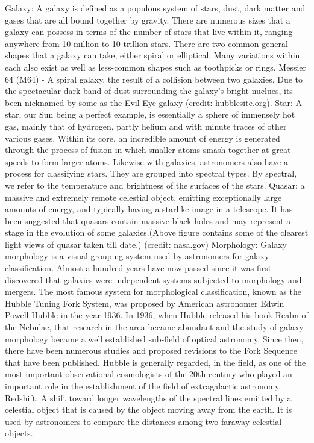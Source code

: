 \documentclass[11pt]{article}
\begin{document}
Galaxy: A galaxy is defined as a populous system of stars, dust, dark
matter and gases that are all bound together by gravity. There are
numerous sizes that a galaxy can possess in terms of the number of stars
that live within it, ranging anywhere from 10 million to 10 trillion
stars. There are two common general shapes that a galaxy can take,
either spiral or elliptical. Many variations within each also exist as
well as less-common shapes such as toothpicks or rings. Messier 64 (M64)
- A spiral galaxy, the result of a collision between two galaxies. Due
to the spectacular dark band of dust surrounding the galaxy's bright
nuclues, its been nicknamed by some as the Evil Eye galaxy (credit:
hubblesite.org). Star: A star, our Sun being a perfect example, is
essentially a sphere of immensely hot gas, mainly that of hydrogen,
partly helium and with minute traces of other various gases. Within its
core, an incredible amount of energy is generated through the process of
fusion in which smaller atoms smash together at great speeds to form
larger atoms. Likewise with galaxies, astronomers also have a process
for classifying stars. They are grouped into spectral types. By
spectral, we refer to the temperature and brightness of the surfaces of
the stars. Quasar: a massive and extremely remote celestial object,
emitting exceptionally large amounts of energy, and typically having a
starlike image in a telescope. It has been suggested that quasars
contain massive black holes and may represent a stage in the evolution
of some galaxies.(Above figure contains some of the clearest light views
of quasar taken till date.) (credit: nasa.gov) Morphology: Galaxy
morphology is a visual grouping system used by astronomers for galaxy
classification. Almost a hundred years have now passed since it was
first discovered that galaxies were independent systems subjected to
morphology and mergers. The most famous system for morphological
classification, known as the Hubble Tuning Fork System, was proposed by
American astronomer Edwin Powell Hubble in the year 1936. In 1936, when
Hubble released his book Realm of the Nebulae, that research in the area
became abundant and the study of galaxy morphology became a well
established sub-field of optical astronomy. Since then, there have been
numerous studies and proposed revisions to the Fork Sequence that have
been published. Hubble is generally regarded, in the field, as one of
the most important observational cosmologists of the 20th century who
played an important role in the establishment of the field of
extragalactic astronomy. Redshift: A shift toward longer wavelengths of
the spectral lines emitted by a celestial object that is caused by the
object moving away from the earth. It is used by astronomers to compare
the distances among two faraway celestial objects.
\end{document}
